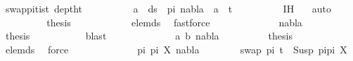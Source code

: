 \begin{isabellebody}
\ swap{\isacharunderscore}{\kern0pt}pi{\isacharunderscore}{\kern0pt}t{}{\isacharunderscore}{\kern0pt}is{\isacharunderscore}{\kern0pt}t{}\ deptht{}\ \isanewline
\ \ \ \ \ \ \isamarkupfalse%
\ {\isachardoublequoteopen}{\isasymforall}\ a\ {\isasymin}\ ds\ {\isacharbrackleft}{\kern0pt}{\isacharbrackright}{\kern0pt}\ pi{\isachardot}{\kern0pt}\ nabla\ {\isasymturnstile}\ a\ {\isasymsharp}\ t{}{\isachardoublequoteclose}\isanewline
\ \ \ \ \ \ \ \ \isamarkupfalse%
\ {\isachardoublequoteopen}{}{\isachardot}{\kern0pt}IH{\isachardoublequoteclose}\ {}{\isacharparenleft}{\kern0pt}{}{\isacharcomma}{\kern0pt}{}{\isacharparenright}{\kern0pt}\ \isamarkupfalse%
\ auto\isanewline
\ \ \ \ \ \ \isamarkupfalse%
\ \isamarkupfalse%
\ {\isacharquery}{\kern0pt}thesis\ \isanewline
\ \ \ \ \ \ \ \ \isamarkupfalse%
\ {}{\isacharparenleft}{\kern0pt}{}{\isacharcomma}{\kern0pt}{}{\isacharcomma}{\kern0pt}{}{\isacharparenright}{\kern0pt}\ elem{\isacharunderscore}{\kern0pt}ds\ \isamarkupfalse%
\ fastforce\isanewline
\ \ \ \ \isamarkupfalse%
\isanewline
\ \ \ \ \ \ \isamarkupfalse%
\ {\isacharparenleft}{\kern0pt}{}\ nabla{\isacharparenright}{\kern0pt}\isanewline
\ \ \ \ \ \ \isamarkupfalse%
\ \isamarkupfalse%
\ {\isacharquery}{\kern0pt}thesis\ \isanewline
\ \ \ \ \ \ \ \ \isamarkupfalse%
\ blast\isanewline
\ \ \ \ \isamarkupfalse%
\isanewline
\ \ \ \ \ \ \isamarkupfalse%
\ {\isacharparenleft}{\kern0pt}{}\ a\ b\ nabla{\isacharparenright}{\kern0pt}\isanewline
\ \ \ \ \ \ \isamarkupfalse%
\ \isamarkupfalse%
\ {\isacharquery}{\kern0pt}thesis\isanewline
\ \ \ \ \ \ \ \ \isamarkupfalse%
\ elem{\isacharunderscore}{\kern0pt}ds\ \isamarkupfalse%
\ force\isanewline
\ \ \ \ \isamarkupfalse%
\isanewline
\ \ \ \ \ \ \isamarkupfalse%
\ {\isacharparenleft}{\kern0pt}{}\ pi{}\ pi{}\ X\ nabla{\isacharparenright}{\kern0pt}\isanewline
\ \ \ \ \ \ \isamarkupfalse%
\ {\isachardoublequoteopen}swap\ pi\ t\ {\isacharequal}{\kern0pt}\ Susp\ {\isacharparenleft}{\kern0pt}pi{\isacharat}{\kern0pt}pi{}{\isacharparenright}{\kern0pt}\ X{\isachardoublequoteclose}\ \isanewline

\end{isabellebody}
